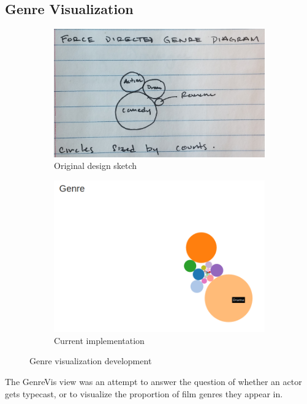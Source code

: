 \documentclass[12pt]{article}
\begin{document}
\subsection{Genre Visualization}

	\begin{figure}[h!]
		\centering
		\begin{subfigure}[t]{.5\textwidth}
		  \centering
		  \includegraphics[width=\linewidth]{images/genreVis_crop.png}
		  \caption{Original design sketch}
		  \label{fig:sub1}
		\end{subfigure}%
		\begin{subfigure}[t]{.8\textwidth}
		  \centering
		  \includegraphics[width=.7\linewidth]{images/genreVis.png}
		  \caption{Current implementation}
		  \label{fig:sub2}
		\end{subfigure}%
		\caption{Genre visualization development}
		\label{fig:genreVis}
	\end{figure}

	
The GenreVis view was an attempt to answer the question of whether an actor gets typecast, or to visualize the proportion of film genres they appear in.  
\end{document}
